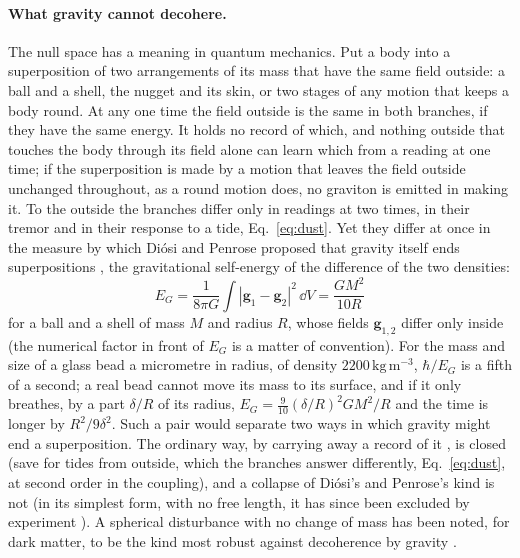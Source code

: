 \paragraph{What gravity cannot decohere.} The null space has a meaning in
quantum mechanics. Put a body into a superposition of two arrangements of its
mass that have the same field outside: a ball and a shell, the nugget and its
skin, or two stages of any motion that keeps a body round. At any one time the
field outside is the same in both branches, if they have the same energy. It holds no record of which, and
nothing outside that touches the body through its field alone can learn which
from a reading at one time; if the superposition is made by a motion that leaves the field
outside unchanged throughout, as a round motion does, no graviton is emitted in
making it. To the outside the branches differ only in readings at two times, in their
tremor and in their response to a tide, Eq.~\eqref{eq:dust}. Yet they differ at
once in the measure by which Di\'osi
and Penrose proposed that gravity itself ends superpositions
\cite{Diosi1987,Penrose1996}, the gravitational self-energy of the difference
of the two densities:
\begin{equation}\label{eq:dp-energy}
E_G = \frac{1}{8\pi G}\int|\mathbf g_1 - \mathbf g_2|^2\,\dd V = \frac{GM^2}{10R}
\end{equation}
for a ball and a shell of mass $M$ and radius $R$, whose fields
$\mathbf g_{1,2}$ differ only inside (the numerical factor in front of $E_G$ is
a matter of convention). For the mass and size of a glass bead a micrometre in
radius, of density $2200\,\mathrm{kg\,m^{-3}}$, $\hbar/E_G$ is a fifth of a second; a real bead cannot move its mass to
its surface, and if it only breathes, by a part $\delta/R$ of its radius,
$E_G = \tfrac{9}{10}(\delta/R)^2GM^2/R$ and the time is longer by
$R^2/9\delta^2$. Such a pair would separate two ways in which gravity might end
a superposition. The ordinary way, by carrying away a record of it
\cite{Belenchia2018,DanielsonSatishchandranWald2022}, is closed (save for
tides from outside, which the branches answer differently, Eq.~\eqref{eq:dust},
at second order in the coupling), and a collapse
of Di\'osi's and Penrose's kind is not (in its simplest form, with no free
length, it has since been excluded by experiment \cite{DonadiEtAl2021}). A spherical
disturbance with no change of mass has been noted, for dark matter, to be the
kind most robust against decoherence by gravity \cite{AllaliHertzberg2020}.
